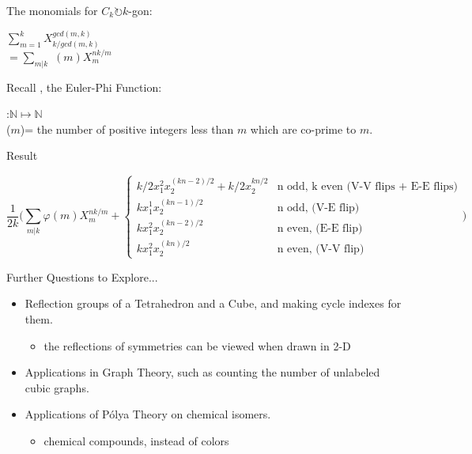 \documentclass{beamer}
\begin{document}
\begin{frame}
	\begin{tcolorbox}[colback=yellow!10!white,colframe=red!75!black,title=Theorem: Rotation Monomials]
		The monomials for $C_k\circlearrowright k$-gon:\\
		\begin{center}
			$\sum\limits_{m=1}^kX_{k/gcd(m,k)}^{gcd(m,k)}$\\
            $=\sum\limits_{m|k}$ \varphi$(m)X_m^{nk/m}$ \\
		\end{center}
	\end{tcolorbox}
    Recall \varphi, the Euler-Phi Function:
    \begin{center}
    \varphi:$\mathbb{N} \mapsto \mathbb{N}$\\
			\varphi($m$)= the number of positive integers less than $m$ which are co-prime to $m$.
    \end{center}
\end{frame}
\begin{frame}{Result}
 \begin{tcolorbox}[colback=yellow!10!white,colframe=red!75!black,title= General Formula $D_k \circlearrowright$ $nk$-gon]
 			\[\frac{1}{2k}\bigg( \sum\limits_{m|k} \varphi(m)X_m^{nk/m} +
\begin{cases}
k/2x_1^2x_2^{(kn-2)/2}+k/2x_2^{kn/2} & \text{n odd, k even (V-V flips + E-E flips)}\\
kx_1^1x_2^{(kn-1)/2} & \text{n odd, (V-E flip)} \\
kx_1^2x_2^{(kn-2)/2} & \text{n even, (E-E flip)}\\
kx_1^2x_2^{(kn)/2} & \text{n even, (V-V flip)}
\end{cases}\bigg)\]
         \end{tcolorbox}

\end{frame}


\begin{frame}{Further Questions to Explore...}
\begin{itemize}
\item Reflection groups of a Tetrahedron and a Cube, and making cycle indexes for them.
	\begin{itemize}
	\item the reflections of symmetries can be viewed  when drawn in 2-D
	\end{itemize}
\item Applications in Graph Theory, such as counting the number of unlabeled cubic graphs.
\item Applications of Pólya Theory on chemical isomers.
\begin{itemize}
	\item chemical compounds, instead of colors
	\end{itemize}
\end{itemize}
\end{frame}
\end{document}
